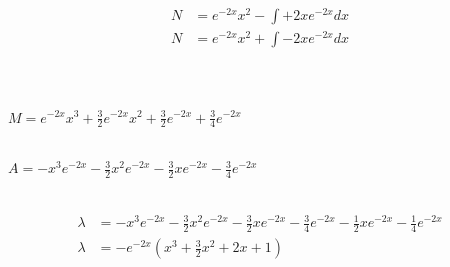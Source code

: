 \begin{align*}
	N &= e^{-2x} x^2 - \int + 2xe^{-2x}dx \\
	N &= e^{-2x} x^2 + \int - 2xe^{-2x}dx
\end{align*}
 \\
 \\

 \\
$M = e^{-2x}x^3 + \frac{3}{2}e^{-2x}x^2 + \frac{3}{2} e^{-2x} + \frac{3}{4}e^{-2x}$

 \\
$A = -x^3e^{-2x} -\frac{3}{2}x^2e^{-2x} - \frac{3}{2}xe^{-2x} - \frac{3}{4}e^{-2x}$

 \\
\begin{align*}
	\lambda &= -x^3e^{-2x} -\frac{3}{2}x^2e^{-2x} - \frac{3}{2}xe^{-2x} - \frac{3}{4}e^{-2x} -\frac{1}{2}xe^{-2x} - \frac{1}{4} e^{-2x} \\
	\lambda &= -e^{-2x}(x^3 + \frac{3}{2}x^2 +2x +1)
\end{align*}

 \\
